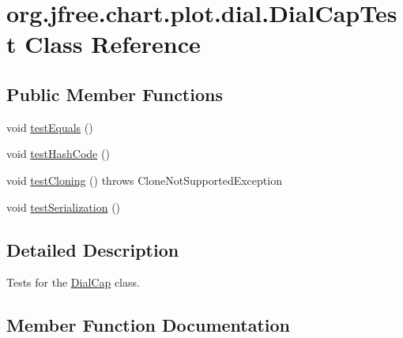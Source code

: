 \hypertarget{classorg_1_1jfree_1_1chart_1_1plot_1_1dial_1_1_dial_cap_test}{}\section{org.\+jfree.\+chart.\+plot.\+dial.\+Dial\+Cap\+Test Class Reference}
\label{classorg_1_1jfree_1_1chart_1_1plot_1_1dial_1_1_dial_cap_test}
\subsection*{Public Member Functions}
\begin{DoxyCompactItemize}
\item 
void \mbox{\hyperlink{classorg_1_1jfree_1_1chart_1_1plot_1_1dial_1_1_dial_cap_test_ac911c6b6fb43401595b8aef59de7c4e8}{test\+Equals}} ()
\item 
void \mbox{\hyperlink{classorg_1_1jfree_1_1chart_1_1plot_1_1dial_1_1_dial_cap_test_a083c2a9ea7af8d60c731c5e1a5284e99}{test\+Hash\+Code}} ()
\item 
void \mbox{\hyperlink{classorg_1_1jfree_1_1chart_1_1plot_1_1dial_1_1_dial_cap_test_a876682b613a7adbc600ee483a95d51ca}{test\+Cloning}} ()  throws Clone\+Not\+Supported\+Exception 
\item 
void \mbox{\hyperlink{classorg_1_1jfree_1_1chart_1_1plot_1_1dial_1_1_dial_cap_test_a5f99a47f66a92442f54f12cf8ba18efc}{test\+Serialization}} ()
\end{DoxyCompactItemize}


\subsection{Detailed Description}
Tests for the \mbox{\hyperlink{classorg_1_1jfree_1_1chart_1_1plot_1_1dial_1_1_dial_cap}{Dial\+Cap}} class. 

\subsection{Member Function Documentation}
\mbox{\label{classorg_1_1jfree_1_1chart_1_1plot_1_1dial_1_1_dial_cap_test_a876682b613a7adbc600ee483a95d51ca}} 
